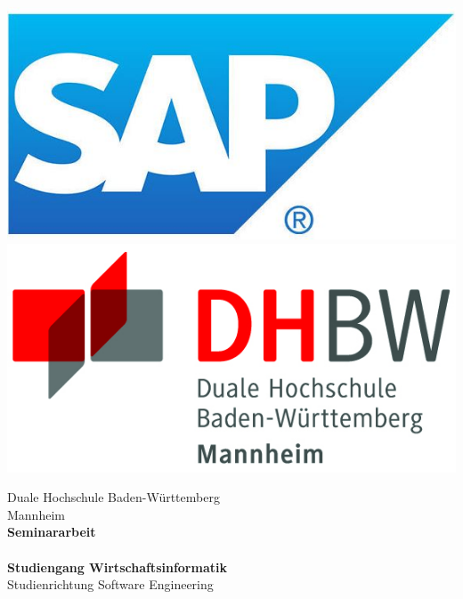 \begin{titlepage}
\begin{minipage}{\textwidth}
		\vspace{-2cm}
		\noindent \includegraphics[scale=0.27]{img/sap.jpg} \hfill   \includegraphics{img/logo.jpg}
\end{minipage}
\vspace{1em}
\sffamily
\begin{center}
	\textsf{\large{}Duale Hochschule Baden-W\"urttemberg\\[1.5mm] Mannheim}\\[2em]
	\textsf{\textbf{\Large{}Seminararbeit}}\\[7mm]
	\textsf{\textbf{\Large{}\DerTitelDerArbeit}} \\[1.5cm]
	
	\textsf{\textbf{\Large{}Studiengang Wirtschaftsinformatik}\\[3mm] \textsf{Studienrichtung Software Engineering}}\\
	

\end{center}
\end{titlepage}
